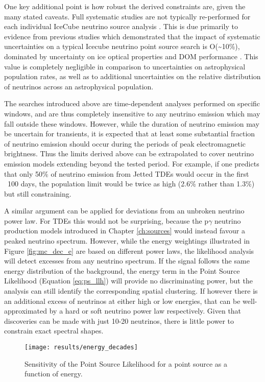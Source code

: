 One key additional point is how robust the derived constraints are, given the many stated caveats. Full systematic studies are not typically re-performed for each individual IceCube neutrino source analysis . This is due primarily to evidence from previous studies which demonstrated that the impact of systematic uncertainties on a typical Icecube neutrino point source search is O(\sim10\%), dominated by uncertainty on ice optical properties and DOM performance  . This value is completely negligible in comparison to uncertainties on astrophysical population rates, as well as to additional uncertainties on the relative distribution of neutrinos across an astrophysical population. 

The searches introduced above are time-dependent analyses performed on specific windows, and are thus completely insensitive to any neutrino emission which may fall outside these windows. However, while the duration of neutrino emission may be uncertain for transients, it is expected that at least some substantial fraction of neutrino emission should occur during the periods of peak electromagnetic brightness. Thus the limits derived above can be extrapolated to cover neutrino emission models extending beyond the tested period. For example, if one predicts that only 50\% of neutrino emission from Jetted TDEs would occur in the first ~100 days, the population limit would be twice as high (2.6\% rather than 1.3\%) but still constraining.

A similar argument can be applied for deviations from an unbroken neutrino power law. For TDEs this would not be surprising, because the p$\gamma$ neutrino production models introduced in Chapter \ref{ch:sources} would instead favour a peaked neutrino spectrum. However, while the energy weightings illustrated in Figure \ref{fig:mc_dec_e} are based on different power laws, the likelihood analysis will detect excesses from any neutrino spectrum. If the signal follows the same energy distribution of the background, the energy term in the Point Source Likelihood (Equation \ref{eq:ps_llh}) will provide no discriminating power, but the analysis can still identify the corresponding spatial clustering. If however there is an additional excess of neutrinos at either high or low energies, that can be well-approximated by a hard or soft neutrino power law respectively. Given that discoveries can be made with just 10-20 neutrinos, there is little power to constrain exact spectral shapes. 

\begin{figure}[!ht]
	\centering \texttt{[image: results/energy\_decades]}
	\caption{Sensitivity of the Point Source Likelihood for a point source as a function of energy.}
	\label{fig:sens_disc_energy}
\end{figure}

